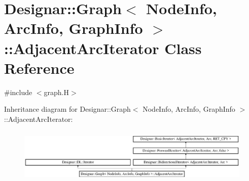 \hypertarget{class_designar_1_1_graph_1_1_adjacent_arc_iterator}{}\section{Designar\+:\+:Graph$<$ Node\+Info, Arc\+Info, Graph\+Info $>$\+:\+:Adjacent\+Arc\+Iterator Class Reference}
\label{class_designar_1_1_graph_1_1_adjacent_arc_iterator}


{\ttfamily \#include $<$graph.\+H$>$}

Inheritance diagram for Designar\+:\+:Graph$<$ Node\+Info, Arc\+Info, Graph\+Info $>$\+:\+:Adjacent\+Arc\+Iterator\+:\begin{figure}[H]
\begin{center}
\leavevmode
\includegraphics[height=2.666667cm]{class_designar_1_1_graph_1_1_adjacent_arc_iterator}
\end{center}
\end{figure}
